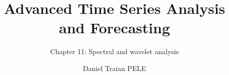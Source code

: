 \title[Advanced Time Series Analysis and Forecasting]{Advanced Time Series Analysis and Forecasting}
\subtitle{Chapter 11: Spectral and wavelet analysis}
\author[D.T. Pele]{Daniel Traian PELE}
\date{}

\providecommand{\atsapplink}[3]{\hypertarget{#2}{}\hyperlink{#1}{\beamergotobutton{#3}}}  %
\providecommand{\atsappback}[2]{\begin{tikzpicture}[remember picture,overlay]\node[anchor=south east] at ([xshift=-3mm,yshift=7mm]current page.south east){\hyperlink{#1}{\beamerreturnbutton{#2}}};\end{tikzpicture}}  %
\providecommand{\atschlink}[2]{\href{#1}{#2}}  %
\providecommand{\atschlinkt}[2]{\href{#1}{\usebeamercolor[fg]{frametitle}#2}}  %


